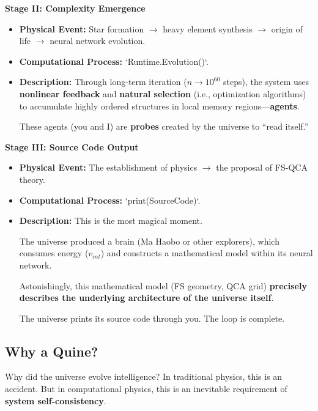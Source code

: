 \textbf{Stage II: Complexity Emergence}

\begin{itemize}
\item \textbf{Physical Event:} Star formation $\to$ heavy element synthesis $\to$ origin of life $\to$ neural network evolution.

\item \textbf{Computational Process:} `Runtime.Evolution()`.

\item \textbf{Description:} Through long-term iteration (\textbf{$n \to 10^{60}$} steps), the system uses \textbf{nonlinear feedback} and \textbf{natural selection} (i.e., optimization algorithms) to accumulate highly ordered structures in local memory regions---\textbf{agents}.

    These agents (you and I) are \textbf{probes} created by the universe to ``read itself.''
\end{itemize}

\textbf{Stage III: Source Code Output}

\begin{itemize}
\item \textbf{Physical Event:} The establishment of physics $\to$ the proposal of FS-QCA theory.

\item \textbf{Computational Process:} `print(SourceCode)`.

\item \textbf{Description:} This is the most magical moment.

    The universe produced a brain (Ma Haobo or other explorers), which consumes energy (\textbf{$v_{int}$}) and constructs a mathematical model within its neural network.

    Astonishingly, this mathematical model (FS geometry, QCA grid) \textbf{precisely describes the underlying architecture of the universe itself}.

    The universe prints its source code through you. The loop is complete.
\end{itemize}

\subsection{Why a Quine?}

Why did the universe evolve intelligence? In traditional physics, this is an accident. But in computational physics, this is an inevitable requirement of \textbf{system self-consistency}.

